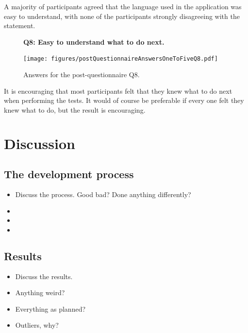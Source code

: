 \documentclass[nofilelist,dvipsnames]{cslthse-msc}
\begin{document}
        A majority of participants agreed that the language used in the
        application was easy to understand, with none of the participants
        strongly disagreeing with the statement.

				\begin{figure}[h!]
          \textbf{Q8: Easy to understand what to do next.}
          \begin{center}
            \texttt{[image: figures/postQuestionnaireAnswersOneToFiveQ8.pdf]}
            \vspace{-1cm}
            \caption{Answers for the post-questionnaire Q8.}
          \end{center}
				\end{figure}

        It is encouraging that most participants felt that they knew what to do
        next when performing the tests. It would of course be preferable if
        every one felt they knew what to do, but the result is encouraging.

		\section{Discussion}

      \subsection{The development process}


        \begin{itemize}
          \item{Discuss the process. Good bad? Done anything differently?}
          \item{}
          \item{}
          \item{}
        \end{itemize}

      \subsection{Results}

        \begin{itemize}
          \item{Discuss the results.}
          \item{Anything weird?}
          \item{Everything as planned?}
          \item{Outliers, why?}
        \end{itemize}
\end{document}
